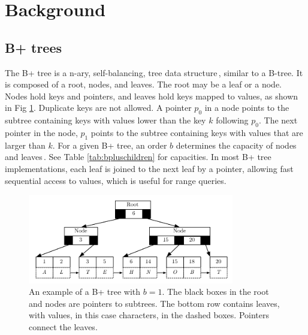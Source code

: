 \section{Background}
\label{sec:Background}
\subsection{B+ trees}
\label{subsec:Background_Bplus_tree}
The B+ tree is a n-ary, self-balancing, tree data structure\,\cite[pp. 334]{ramakrishnan2003database}, similar to a B-tree. It is composed of a root, nodes, and leaves. The root may be a leaf or a node. Nodes hold keys and pointers, and leaves hold keys mapped to values, as shown in Fig \ref{fig:bplustree}. Duplicate keys are not allowed. A pointer $p_0$ in a node points to the subtree containing keys with values lower than the key $k$ following $p_0$. The next pointer in the node, $p_1$ points to the subtree containing keys with values that are larger than $k$. For a given B+ tree, an order $b$ determines the capacity of nodes and leaves\,\cite[p. 335]{ramakrishnan2003database}. See Table \ref{tab:bpluschildren} for capacities. In most B+ tree implementations, each leaf is joined to the next leaf by a pointer, allowing fast sequential access to values, which is useful for range queries.


\begin{figure}
 \centering
   \includegraphics[width=90mm]{diagrams/BPlusTree.pdf}
 \caption{An example of a B+ tree with $b=1$. The black boxes in the root and nodes are pointers to subtrees. The bottom row contains leaves, with values, in this case characters, in the dashed boxes. Pointers connect the leaves.}
 \label{fig:bplustree}
\end{figure}

